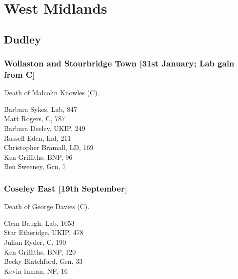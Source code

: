\documentclass[a4paper,openany,10pt]{book}
\begin{document}
\vfill

\section[West Midlands]{{West Midlands}}

\subsection*{Dudley}

\subsubsection*{Wollaston and Stourbridge Town \hspace*{\fill}\nolinebreak[1]%
\enspace\hspace*{\fill}
[31st January; Lab gain from C]}


Death of Malcolm Knowles (C).



Barbara Sykes, Lab, 847\\
Matt Rogers, C, 787\\
Barbara Deeley, UKIP, 249\\
Russell Eden, Ind, 211\\
Christopher Bramall, LD, 169\\
Ken Griffiths, BNP, 96\\
Ben Sweeney, Grn, 7\\


\subsubsection*{Coseley East \hspace*{\fill}\nolinebreak[1]%
\enspace\hspace*{\fill}
[19th September]}


Death of George Davies (C).



Clem Baugh, Lab, 1053\\
Star Etheridge, UKIP, 478\\
Julian Ryder, C, 190\\
Ken Griffiths, BNP, 120\\
Becky Blatchford, Grn, 33\\
Kevin Inman, NF, 16\\
\end{document}
